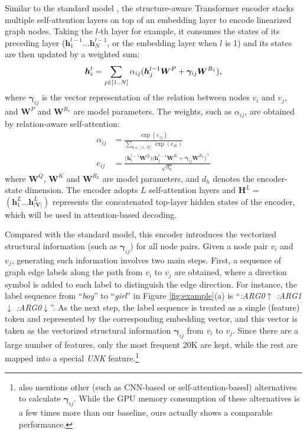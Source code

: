 \documentclass[11pt,a4paper]{article}
\begin{document}
Similar to the standard model
\citep{vaswani2017attention}, the structure-aware Transformer encoder stacks multiple self-attention layers on top of an embedding layer to encode linearized graph nodes.
Taking the $l$-th layer for example, it consumes the states of its preceding layer ($\boldsymbol{h}_1^{l-1}\dots \boldsymbol{h}_N^{l-1}$, or the embedding layer when $l$ is 1) and its states are then updated by a weighted sum:
\begin{equation}
    \boldsymbol{h}_i^{l} = \sum_{j\in[1..N]} \alpha_{ij}\large( \boldsymbol{h}_j^{l-1} \boldsymbol{W}^P + \boldsymbol{\gamma}_{ij}\boldsymbol{W}^{R_1} \large) \text{,}
\end{equation}
where $\boldsymbol{\gamma}_{ij}$ is the vector representation of the relation between nodes $v_i$ and $v_j$, and $\boldsymbol{W}^P$ and $\boldsymbol{W}^{R_1}$ are model parameters.
The weights, such as $\alpha_{ij}$, are obtained by relation-aware self-attention:
\begin{align}
    \alpha_{ij} &= \frac{\exp(e_{ij})}{\sum_{k\in[1..N]}\exp(e_{ik})} \\
    e_{ij} &= \frac{\big(\boldsymbol{h}_i^{l-1}\boldsymbol{W}^Q\big)\big(\boldsymbol{h}_j^{l-1}\boldsymbol{W}^K+\boldsymbol{\gamma}_{ij}\boldsymbol{W}^{R_2}\big)^\intercal}{\sqrt{d_h}} \end{align}
where $\boldsymbol{W}^Q$, $\boldsymbol{W}^K$ and $\boldsymbol{W}^{R_2}$ are model parameters, and $d_h$ denotes the encoder-state dimension.
The encoder adopts $L$ self-attention layers and $\boldsymbol{H}^L=$ $(\boldsymbol{h}_1^{L}\dots \boldsymbol{h}_{|\boldsymbol{V}|}^{L})$ represents the concatenated top-layer hidden states of the encoder, which will be used in attention-based decoding.


Compared with the standard model, this encoder introduces the vectorized structural information (such as $\boldsymbol{\gamma}_{ij}$) for all node pairs.
Given a node pair $v_i$ and $v_j$, generating such information involves two main steps.
First, a sequence of graph edge labels along the path from $v_i$ to $v_j$ are obtained, where a direction symbol is added to each label to distinguish the edge direction.
For instance, the label sequence from ``\emph{boy}'' to ``\emph{girl}'' in Figure \ref{fig:example}(a) is ``\emph{:ARG0$\uparrow$ :ARG1$\downarrow$ :ARG0$\downarrow$}''.
As the next step, the label sequence is treated as a single (feature) token and represented by the corresponding embedding vector, and this vector is taken as the vectorized structural information $\boldsymbol{\gamma}_{ij}$ from $v_i$ to $v_j$.
Since there are a large number of features, only the most frequent 20K are kept, while the rest are mapped into a special \emph{UNK} feature.\footnote{\citet{zhu2019modeling} also mentions other (such as CNN-based or self-attention-based) alternatives to calculate $\boldsymbol{\gamma}_{ij}$. While the GPU memory consumption of these alternatives is a few times more than our baseline, ours actually shows a comparable performance.}
\end{document}
